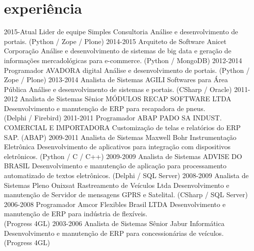 \documentclass[]{twentysecondcv}
\begin{document}
\section{experiência}

\begin{twenty}
  \twentyitem
    {2015-Atual}
    {Lider de equipe}
    {Simples Consultoria}
    {Análise e desenvolvimento de portais. (Python / Zope / Plone)}
  \twentyitem
    {2014-2015}
    {Arquiteto de Software}
    {Anicet Corporação}
    {Análise e desenvolvimento de sistemas de big data e geração de informações mercadológicas para e-commerce. (Python / MongoDB)}
  \twentyitem
    {2012-2014}
    {Programador}
    {AVADORA digital}
    {Análise e desenvolvimento de portais. (Python / Zope / Plone)}
  \twentyitem
    {2013-2014}
    {Analista de Sistemas}
    {AGILI Softwares para Área Pública}
    {Análise e desenvolvimento de sistemas e portais. (CSharp / Oracle)}
  \twentyitem
    {2011-2012}
    {Analista de Sistemas Sênior}
    {MÓDULOS RECAP SOFTWARE LTDA}
    {Desenvolvimento e manutenção de ERP para recapadora de pneus.\\
    (Delphi / Firebird)}
  \twentyitem
    {2011-2011}
    {Programador ABAP}
    {PADO SA INDUST. COMERCIAL E IMPORTADORA}
    {Customização de telas e relatórios do ERP SAP. (ABAP)}
  \twentyitem
    {2009-2011}
    {Analista de Sistemas}
    {Maxwell Bohr Instrumentação Eletrônica}
    {Desenvolvimento de aplicativos para integração com dispositivos eletrônicos. (Python / C / C++)}
  \twentyitem
    {2009-2009}
    {Analista de Sistemas}
    {ADVISE DO BRASIL}
    {Desenvolvimento e manutenção de aplicação para processamento automatizado de textos eletrônicos. (Delphi / SQL Server)}
  \twentyitem
    {2008-2009}
    {Analista de Sistemas Pleno}
    {Onixsat Rastreamento de Veículos Ltda}
    {Desenvolvimento e manutenção de Servidor de mensagens GPRS e Satelital. (CSharp / SQL Server)}
  \twentyitem
    {2006-2008}
    {Programador}
    {Amcor Flexibles Brasil LTDA}
    {Desenvolvimento e manutenção de ERP para indústria de flexíveis.\\
    (Progress 4GL)}
  \twentyitem
    {2003-2006}
    {Analista de Sistemas Sênior}
    {Jabur Informática}
    {Desenvolvimento e manutenção de ERP para concessionárias de veículos.\\
    (Progress 4GL)}
\end{twenty}
\end{document}
